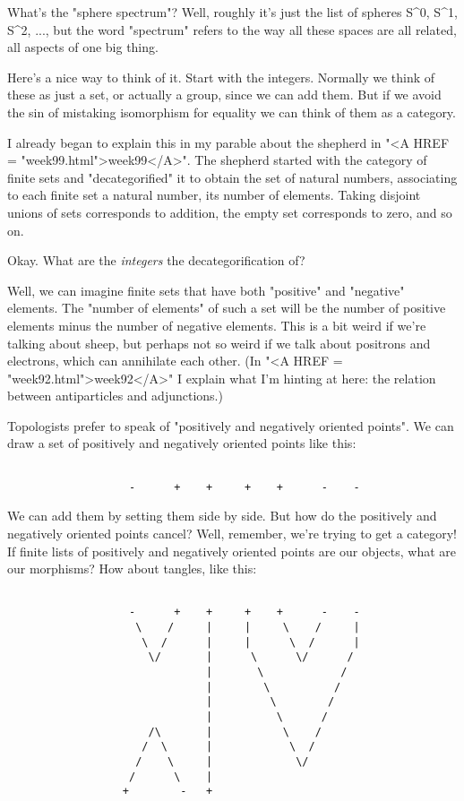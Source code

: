 What's the "sphere spectrum"?  Well, roughly it's just the list
of spheres S^{0}, S^{1}, S^{2}, ..., but the word "spectrum" refers to the
way all these spaces are all related, all aspects of one big thing.

Here's a nice way to think of it.  Start with the integers.  Normally
we think of these as just a set, or actually a group, since we can add
them.  But if we avoid the sin of mistaking isomorphism for equality
we can think of them as a category.  

I already began to explain this in my parable about the shepherd in
"<A HREF = "week99.html">week99</A>".  The shepherd started with the category of finite sets and
"decategorified" it to obtain the set of natural numbers, associating to
each finite set a natural number, its number of elements.  Taking
disjoint unions of sets corresponds to addition, the empty set
corresponds to zero, and so on.

Okay.  What are the \emph{integers} the decategorification of?

Well, we can imagine finite sets that have both "positive" and
"negative" elements.  The "number of elements" of such a set will be the
number of positive elements minus the number of negative elements.  This
is a bit weird if we're talking about sheep, but perhaps not so weird if
we talk about positrons and electrons, which can annihilate each other.
(In "<A HREF = "week92.html">week92</A>" I explain what I'm hinting at here: the relation between
antiparticles and adjunctions.)

Topologists prefer to speak of "positively and negatively oriented
points".  We can draw a set of positively and negatively oriented points
like this:


\begin{verbatim}

                   -      +    +     +    +      -    -

\end{verbatim}
    
We can add them by setting them side by side.  But how do the positively
and negatively oriented points cancel?  Well, remember, we're trying to
get a category!  If finite lists of positively and negatively oriented
points are our objects, what are our morphisms?  How about tangles, like this:


\begin{verbatim}

                   -      +    +     +    +      -    -
                    \    /     |     |     \    /     |
                     \  /      |     |      \  /      |
                      \/       |      \      \/      /
                               |       \            /
                               |        \          /
                               |         \        /
                               |          \      /    
                      /\       |           \    /
                     /  \      |            \  /
                    /    \     |             \/
                   /      \    |
                  +        -   +

\end{verbatim}
    
